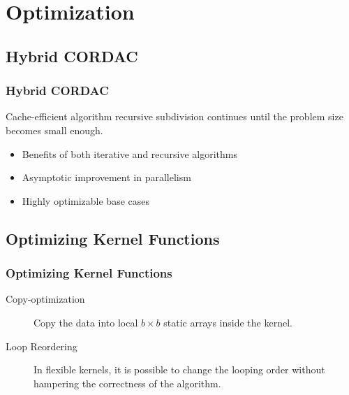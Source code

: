 \section{Optimization}

\subsection{Hybrid CORDAC}
\begin{frame}
    \frametitle{Hybrid CORDAC}
		Cache-efficient algorithm recursive subdivision continues until 
		the problem size becomes small enough.
	\begin{itemize}
		\item Benefits of both iterative and recursive algorithms
		\item Asymptotic improvement in parallelism
		\item Highly optimizable base cases
	\end{itemize}
\end{frame}

\subsection{Optimizing Kernel Functions}
\begin{frame}
    \frametitle{Optimizing Kernel Functions}
	\begin{description}
		\item[Copy-optimization] Copy the data into local $b \times b$ 
			static arrays inside the kernel.
		\item[Loop Reordering] In flexible kernels, it is possible to change
			the looping order without hampering the correctness of the algorithm.
	\end{description}
\end{frame}

